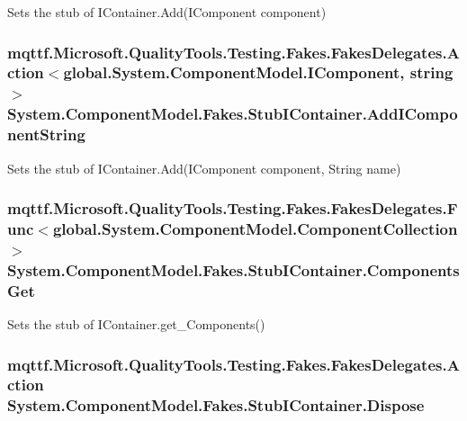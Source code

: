 Sets the stub of I\-Container.\-Add(\-I\-Component component)

\hypertarget{class_system_1_1_component_model_1_1_fakes_1_1_stub_i_container_aa75ef14950c6b431f2723323d8955d94}{
\subsubsection[{Add\-I\-Component\-String}]{\setlength{\rightskip}{0pt plus 5cm}mqttf.\-Microsoft.\-Quality\-Tools.\-Testing.\-Fakes.\-Fakes\-Delegates.\-Action$<$global.\-System.\-Component\-Model.\-I\-Component, string$>$ System.\-Component\-Model.\-Fakes.\-Stub\-I\-Container.\-Add\-I\-Component\-String}}\label{class_system_1_1_component_model_1_1_fakes_1_1_stub_i_container_aa75ef14950c6b431f2723323d8955d94}


Sets the stub of I\-Container.\-Add(\-I\-Component component, String name)

\hypertarget{class_system_1_1_component_model_1_1_fakes_1_1_stub_i_container_a0a3eaa6792233226c151390196b1f021}{
\subsubsection[{Components\-Get}]{\setlength{\rightskip}{0pt plus 5cm}mqttf.\-Microsoft.\-Quality\-Tools.\-Testing.\-Fakes.\-Fakes\-Delegates.\-Func$<$global.\-System.\-Component\-Model.\-Component\-Collection$>$ System.\-Component\-Model.\-Fakes.\-Stub\-I\-Container.\-Components\-Get}}\label{class_system_1_1_component_model_1_1_fakes_1_1_stub_i_container_a0a3eaa6792233226c151390196b1f021}


Sets the stub of I\-Container.\-get\-\_\-\-Components()

\hypertarget{class_system_1_1_component_model_1_1_fakes_1_1_stub_i_container_aad5dad066d6c8bbe05b95cf2ae94abce}{
\subsubsection[{Dispose}]{\setlength{\rightskip}{0pt plus 5cm}mqttf.\-Microsoft.\-Quality\-Tools.\-Testing.\-Fakes.\-Fakes\-Delegates.\-Action System.\-Component\-Model.\-Fakes.\-Stub\-I\-Container.\-Dispose}}\label{class_system_1_1_component_model_1_1_fakes_1_1_stub_i_container_aad5dad066d6c8bbe05b95cf2ae94abce}


